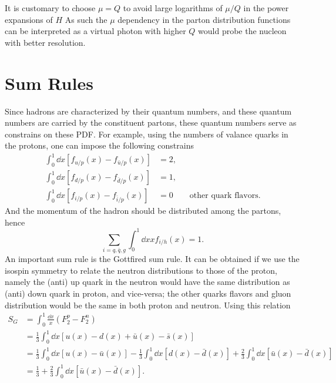 \documentclass[../main.tex]{subfiles}
\begin{document}
It is customary to choose $\mu =Q$ to avoid large logarithms of $\mu /Q$ in the 
power expansions of $H$ As such the $\mu$ dependency in the parton distribution 
functions can be interpreted as a virtual photon with higher $Q$ would probe the
nucleon with better resolution. 

\section{Sum Rules}
\label{sec:sum_rules}
Since hadrons are characterized by their quantum numbers, and these quantum numbers 
are carried by the constituent partons, these quantum numbers serve as constrains
on these PDF. For example, using the numbers of valance quarks in the protons, 
one can impose the following constrains
\begin{equation}
\begin{split}
	\int_{0}^{1} \dd{x} \left[f_{u/p} \left(x\right)-f_{\bar{u}/p} \left(x\right)\right]&=2,\\
	\int_{0}^{1} \dd{x} \left[f_{d/p} \left(x\right)-f_{\bar{d}/p} \left(x\right)\right]&=1,\\
	\int_{0}^{1} \dd{x} \left[f_{i/p} \left(x\right)-f_{\bar{i}/p} \left(x\right)\right]&=0 \qquad \text{other quark flavors}.
\end{split}
\end{equation}
And the momentum of the hadron should be distributed among the partons, hence
\begin{equation}
	\sum_{i=q,\bar{q},g}\int_{0}^{1} \dd{x} xf_{i/h}\left(x\right)=1.
\end{equation}
An important sum rule is the Gottfired sum rule\cite{gottfried1967}. It can be obtained
if we use the isospin symmetry to relate the neutron distributions to those of 
the proton, namely the (anti) up quark in the neutron would have the same distribution 
as (anti) down quark in proton, and vice-versa; the other quarks flavors and gluon
distribution would be the same in both proton and neutron. Using this relation
\begin{equation}
\begin{split}
	S_G & = \int_0^1 \frac{\dd{x}}{x}\left(F_2^{p} - F_{2}^{n}\right)\\
	    & = \frac{1}{3} \int_0^1 \dd{x} \left[u\left(x\right) - d\left(x\right) 
			+ \bar{u}\left(x\right) - \bar{s}\left(x\right)\right]\\
		& = \frac{1}{3} \int_0^1 \dd{x} \left[u\left(x\right) - \bar{u}\left(x\right)\right]
			- \frac{1}{3} \int_0^1 \dd{x} \left[d\left(x\right) - \bar{d}\left(x\right)\right]
			+ \frac{2}{3} \int_0^1 \dd{x} \left[\bar{u}\left(x\right)-\bar{d}\left(x\right)\right]\\
		& = \frac{1}{3} + \frac{2}{3} \int_0^1 \dd{x} \left[\bar{u}\left(x\right)-\bar{d}\left(x\right)\right]. 
\end{split}
\end{equation}
\end{document}
